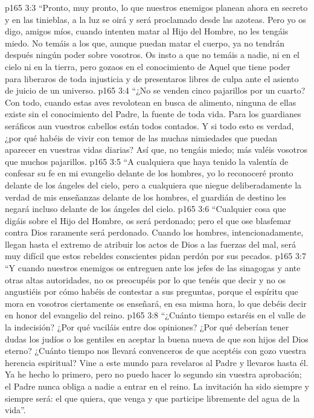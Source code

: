 \vs p165 3:3 “Pronto, muy pronto, lo que nuestros enemigos planean ahora en secreto y en las tinieblas, a la luz se oirá y será proclamado desde las azoteas. Pero yo os digo, amigos míos, cuando intenten matar al Hijo del Hombre, no les tengáis miedo. No temáis a los que, aunque puedan matar el cuerpo, ya no tendrán después ningún poder sobre vosotros. Os insto a que no temáis a nadie, ni en el cielo ni en la tierra, pero gozaos en el conocimiento de Aquel que tiene poder para liberaros de toda injusticia y de presentaros libres de culpa ante el asiento de juicio de un universo.
\vs p165 3:4 “¿No se venden cinco pajarillos por un cuarto? Con todo, cuando estas aves revolotean en busca de alimento, ninguna de ellas existe sin el conocimiento del Padre, la fuente de toda vida. Para los guardianes seráficos aun vuestros cabellos están todos contados. Y si todo esto es verdad, ¿por qué habéis de vivir con temor de las muchas nimiedades que puedan aparecer en vuestras vidas diarias? Así que, no tengáis miedo; más valéis vosotros que muchos pajarillos.
\vs p165 3:5 “A cualquiera que haya tenido la valentía de confesar su fe en mi evangelio delante de los hombres, yo lo reconoceré pronto delante de los ángeles del cielo, pero a cualquiera que niegue deliberadamente la verdad de mis enseñanzas delante de los hombres, el guardián de destino les negará incluso delante de los ángeles del cielo.
\vs p165 3:6 “Cualquier cosa que digáis sobre el Hijo del Hombre, os será perdonado; pero el que ose blasfemar contra Dios raramente será perdonado. Cuando los hombres, intencionadamente, llegan hasta el extremo de atribuir los actos de Dios a las fuerzas del mal, será muy difícil que estos rebeldes conscientes pidan perdón por sus pecados.
\vs p165 3:7 “Y cuando nuestros enemigos os entreguen ante los jefes de las sinagogas y ante otras altas autoridades, no os preocupéis por lo que tenéis que decir y no os angustiéis por cómo habéis de contestar a sus preguntas, porque el espíritu que mora en vosotros ciertamente os enseñará, en esa misma hora, lo que debéis decir en honor del evangelio del reino.
\vs p165 3:8 “¿Cuánto tiempo estaréis en el valle de la indecisión? ¿Por qué vaciláis entre dos opiniones? ¿Por qué deberían tener dudas los judíos o los gentiles en aceptar la buena nueva de que son hijos del Dios eterno? ¿Cuánto tiempo nos llevará convenceros de que aceptéis con gozo vuestra herencia espiritual? Vine a este mundo para revelaros al Padre y llevaros hasta él. Ya he hecho lo primero, pero no puedo hacer lo segundo sin vuestra aprobación; el Padre nunca obliga a nadie a entrar en el reino. La invitación ha sido siempre y siempre será: el que quiera, que venga y que participe libremente del agua de la vida”.
